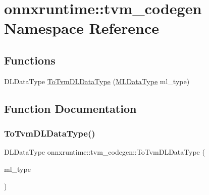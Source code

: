 \hypertarget{namespaceonnxruntime_1_1tvm__codegen}{}\section{onnxruntime\+:\+:tvm\+\_\+codegen Namespace Reference}
\label{namespaceonnxruntime_1_1tvm__codegen}
\subsection*{Functions}
\begin{DoxyCompactItemize}
\item 
D\+L\+Data\+Type \mbox{\hyperlink{namespaceonnxruntime_1_1tvm__codegen_a3636e29a0ffabd8f6f9960a9d3b089fe}{To\+Tvm\+D\+L\+Data\+Type}} (\mbox{\hyperlink{namespaceonnxruntime_ad77d0a6e838ec7da5dc35fed5ee66b49}{M\+L\+Data\+Type}} ml\+\_\+type)
\end{DoxyCompactItemize}


\subsection{Function Documentation}
\mbox{\label{namespaceonnxruntime_1_1tvm__codegen_a3636e29a0ffabd8f6f9960a9d3b089fe}} 
\subsubsection{\texorpdfstring{To\+Tvm\+D\+L\+Data\+Type()}{ToTvmDLDataType()}}
{\footnotesize\ttfamily D\+L\+Data\+Type onnxruntime\+::tvm\+\_\+codegen\+::\+To\+Tvm\+D\+L\+Data\+Type (\begin{DoxyParamCaption}\item[{\mbox{\hyperlink{namespaceonnxruntime_ad77d0a6e838ec7da5dc35fed5ee66b49}{M\+L\+Data\+Type}}}]{ml\+\_\+type }\end{DoxyParamCaption})}

